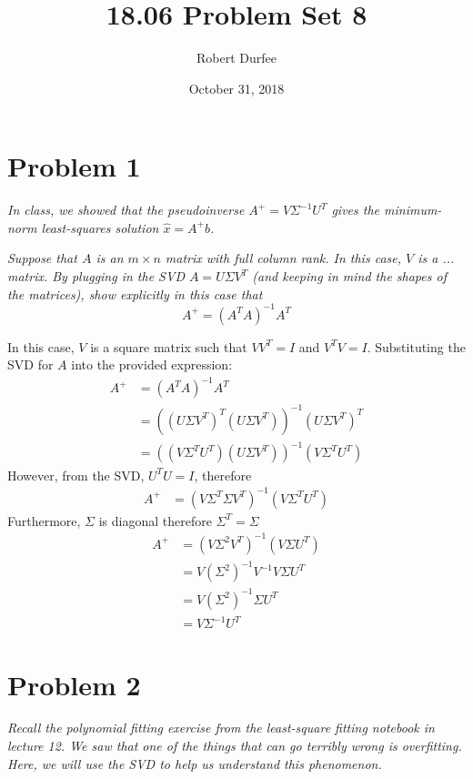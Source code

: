 \documentclass{article}
\title{18.06 Problem Set 8}
\author{Robert Durfee}
\date{October 31, 2018}
\begin{document}
\maketitle

\section*{Problem 1}

\textit{In class, we showed that the pseudoinverse $A^+ = V \Sigma^{-1} U^T$
gives the minimum-norm least-squares solution $\hat{x} = A^+ b$.}

\textit{Suppose that $A$ is an $m\times n$ matrix with full column rank. In
this case, $V$ is a ... matrix. By plugging in the SVD $A = U \Sigma V^T$
(and keeping in mind the shapes of the matrices), show explicitly in this
case that}
$$ A^+ = (A^T A)^{-1} A^T $$

\bigbreak

In this case, $V$ is a square matrix such that $V V^T = I$ and $V^T V = I$.
Substituting the SVD for $A$ into the provided expression:
\begin{align*}
  A^{+} &= (A^T A)^{-1} A^T \\
  &= ((U \Sigma V^T)^T(U \Sigma V^T))^{-1} (U \Sigma V^T)^T \\
  &= ((V \Sigma^T U^T)(U \Sigma V^T))^{-1} (V \Sigma^T U^T)
\end{align*}
However, from the SVD, $U^T U = I$, therefore
\begin{align*}
  A^{+} &= (V \Sigma^T \Sigma V^T)^{-1} (V \Sigma^T U^T)
\end{align*}
Furthermore, $\Sigma$ is diagonal therefore $\Sigma^T = \Sigma$
\begin{align*}
  A^{+} &= (V \Sigma^2 V^T)^{-1} (V \Sigma U^T) \\
  &= V (\Sigma^2)^{-1} V^{-1} V \Sigma U^T \\
  &= V (\Sigma^2)^{-1} \Sigma U^T \\
  &= V \Sigma^{-1} U^T
\end{align*}

\section*{Problem 2}

\textit{Recall the polynomial fitting exercise from the least-square fitting
notebook in lecture 12. We saw that one of the things that can go terribly
wrong is overfitting. Here, we will use the SVD to help us understand this
phenomenon.}
\end{document}
